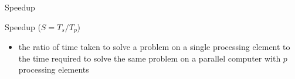 \documentclass[10pt, t]{beamer}
\begin{document}
  \begin{frame}{Speedup}
    \begin{block}{Speedup ($S=T_s/T_p$)}
      \begin{itemize}
        \item the ratio of time taken to solve a problem on a single processing
          element to the time required to solve the same problem on a parallel
          computer with $p$ processing elements
      \end{itemize}
    \end{block}

    \vspace{-2ex}
    \begin{center}
    \end{center}
  \end{frame}
\end{document}
